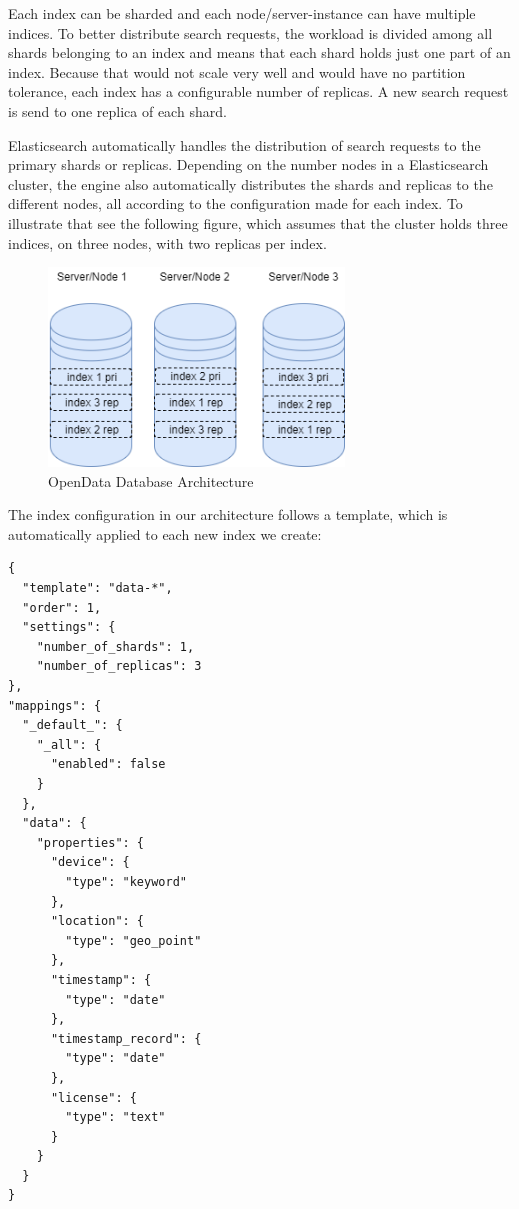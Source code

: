 Each index can be sharded and each node/server-instance can have
multiple indices. To better distribute search requests, the workload is
divided among all shards belonging to an index and means that each shard
holds just one part of an index. Because that would not scale very well
and would have no partition tolerance, each index has a configurable
number of replicas. A new search request is send to one replica of each
shard.

Elasticsearch automatically handles the distribution of search requests
to the primary shards or replicas. Depending on the number nodes in a
Elasticsearch cluster, the engine also automatically distributes the
shards and replicas to the different nodes, all according to the
configuration made for each index. To illustrate that see the following
figure, which assumes that the cluster holds three indices, on three
nodes, with two replicas per index.

\begin{figure}[htbp]
	\centering
	\includegraphics[width=0.7\textwidth]{images/07_database_architecture_elastic.png}
	\caption{OpenData Database Architecture}
	\label{fig:elastic-architecture}
\end{figure}

The index configuration in our architecture follows a template, which is
automatically applied to each new index we create:

\begin{verbatim}
{
  "template": "data-*",
  "order": 1,
  "settings": {
    "number_of_shards": 1,
    "number_of_replicas": 3
},
"mappings": {
  "_default_": {
    "_all": {
      "enabled": false
    }
  },
  "data": {
    "properties": {
      "device": {
        "type": "keyword"
      },
      "location": {
        "type": "geo_point"
      },
      "timestamp": {
        "type": "date"
      },
      "timestamp_record": {
        "type": "date"
      },
      "license": {
        "type": "text"
      }
    }
  }
}
\end{verbatim}

